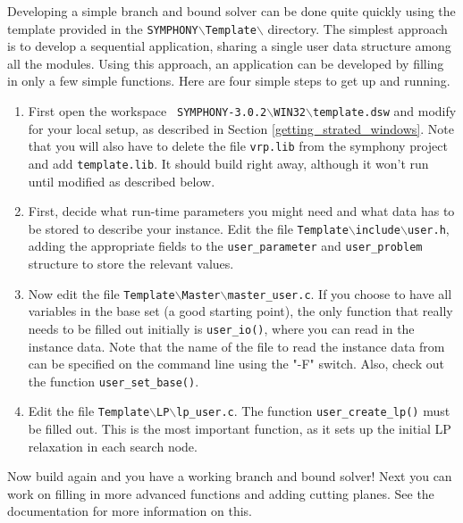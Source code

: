 Developing a simple branch and bound solver can be done quite quickly using
the template provided in the 
\texttt{SYMPHONY$\backslash$Template$\backslash$} directory. The
simplest approach is to develop a sequential application, sharing a single
user data structure among all the modules. Using this approach, an application
can be developed by filling in only a few simple functions. Here are four
simple steps to get up and running.
\begin{enumerate}

\item First open the workspace {\tt
SYMPHONY-3.0.2$\backslash$WIN32$\backslash$template.dsw} and modify for your
local setup, as described in Section \ref{getting_strated_windows}. Note that
you will also have to delete the file \texttt{vrp.lib} from the symphony
project and add \texttt{template.lib}. It should build right away, although it
won't run until modified as described below.

\item First, decide what run-time parameters you might need and what data has 
to be stored to describe your instance. Edit the file
\texttt{Template$\backslash$include$\backslash$user.h}, adding the appropriate
fields to the \texttt{user\_parameter} and \texttt{user\_problem} structure to
store the relevant values.

\item Now edit the file
\texttt{Template$\backslash$Master$\backslash$master\_user.c}. If you choose to 
have all variables in the base set (a good starting point), the only function
that really needs to be filled out initially is \texttt{user\_io()}, where you
can read in the instance data. Note that the name of the file to read the
instance data from can be specified on the command line using the "-F" switch.
Also, check out the function
\texttt{user\_set\_base()}.

\item Edit the file \texttt{Template$\backslash$LP$\backslash$lp\_user.c}. The
function \texttt{user\_create\_lp()} must be filled out. This is the most
important function, as it sets up the initial LP relaxation in each search
node.
\end{enumerate}

Now build again and you have a working branch and bound solver! Next you can
work on filling in more advanced functions and adding cutting planes. See the
documentation for more information on this.

